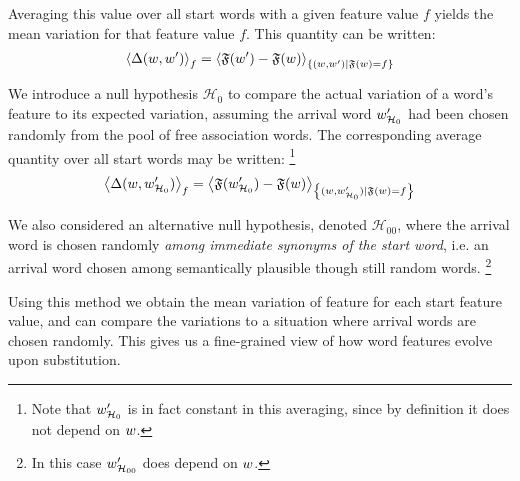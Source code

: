 Averaging this value over all start words with a given feature value $f$ yields the mean variation for that feature value $f$.
This quantity can be written:
$$\left< \Delta(w,w') \right>_f = \left< \mathfrak{F}(w') - \mathfrak{F}(w) \right>_{\left\lbrace (w,w') | \mathfrak{F}(w) = f \right\rbrace}$$

We introduce a null hypothesis $\mathcal{H}_0$ to compare the actual variation of a word's feature to its expected variation, assuming the arrival word $w'_{\mathcal{H}_0}$ had been chosen randomly from the pool of free association words.
The corresponding average quantity over all start words may be written:
\footnote{Note that $w'_{\mathcal{H}_0}$ is in fact constant in this averaging, since by definition it does not depend on $w$.}
$$\left< \Delta(w,w'_{\mathcal{H}_0}) \right>_f = \left< \mathfrak{F}({w'_{\mathcal{H}_0}}) - \mathfrak{F}(w) \right>_{\left\lbrace (w,w'_{\mathcal{H}_0}) | \mathfrak{F}(w) = f \right\rbrace}$$

We also considered an alternative null hypothesis, denoted $\mathcal{H}_{00}$, where the arrival word is chosen randomly \emph{among immediate synonyms of the start word}, i.e. an arrival word chosen among semantically plausible though still random words.
\footnote{In this case $w'_{\mathcal{H}_{00}}$ does depend on $w$.} 

Using this method we obtain the mean variation of feature for each start feature value, and can compare the variations to a situation where arrival words are chosen randomly.
This gives us a fine-grained view of how word features evolve upon substitution.